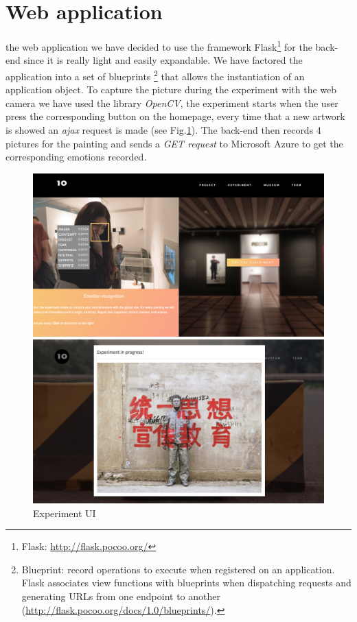 \documentclass[journal, a4paper]{IEEEtran}
\begin{document}
\section{Web application}
 the web application we have decided to use the framework Flask\footnote{Flask: \url{http://flask.pocoo.org/}} for the back-end since it is really light and easily expandable. We have factored the application into a set of blueprints \footnote{Blueprint: record operations to execute when registered on an application. Flask associates view functions with blueprints when dispatching requests and generating URLs from one endpoint to another (\url{http://flask.pocoo.org/docs/1.0/blueprints/}).} that allows the instantiation of an application object. To capture the picture during the experiment with the web camera we have used the library \textit{OpenCV}, the experiment starts when the user press the corresponding button on the homepage, every time that a new artwork is showed an \textit{ajax} request is made (see Fig.\ref{fig:experimentim}). The back-end then records 4 pictures for the painting and sends a \textit{GET request} to Microsoft Azure to get the corresponding emotions recorded. 
\begin{figure}[h]
  \centering
  \begin{minipage}[b]{0.24\textwidth}
    \includegraphics[width=\textwidth]{experiment1.png}
  \end{minipage}
  \hfill
  \begin{minipage}[b]{0.24\textwidth}
    \includegraphics[width=\textwidth]{experiment2.png}
  \end{minipage}
  \caption{Experiment UI}
  \label{fig:experimentim}
\end{figure}
\end{document}
